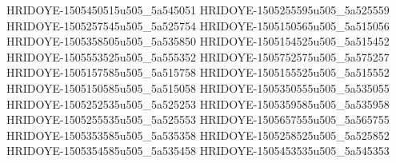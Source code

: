HRIDOYE-1505450515u505_5a545051
HRIDOYE-1505255595u505_5a525559
HRIDOYE-1505257545u505_5a525754
HRIDOYE-1505150565u505_5a515056
HRIDOYE-1505358505u505_5a535850
HRIDOYE-1505154525u505_5a515452
HRIDOYE-1505553525u505_5a555352
HRIDOYE-1505752575u505_5a575257
HRIDOYE-1505157585u505_5a515758
HRIDOYE-1505155525u505_5a515552
HRIDOYE-1505150585u505_5a515058
HRIDOYE-1505350555u505_5a535055
HRIDOYE-1505252535u505_5a525253
HRIDOYE-1505359585u505_5a535958
HRIDOYE-1505255535u505_5a525553
HRIDOYE-1505657555u505_5a565755
HRIDOYE-1505353585u505_5a535358
HRIDOYE-1505258525u505_5a525852
HRIDOYE-1505354585u505_5a535458
HRIDOYE-1505453535u505_5a545353
